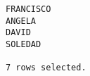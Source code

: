 \documentclass[11pt]{report}
\begin{document}
\begin{itemize}
\begin{verbatim}
FRANCISCO                                                                                                                                                                                                                                                                                                                                                                                                                                                                                                           
ANGELA                                                                                                                                                                                                                                                                                                                                                                                                                                                                                                              
DAVID                                                                                                                                                                                                                                                                                                                                                                                                                                                                                                               
SOLEDAD                                                                                                                                                                                                                                                                                                                                                                                                                                                                                                             

7 rows selected.
  \end{verbatim}
\end{itemize}
\end{document}
